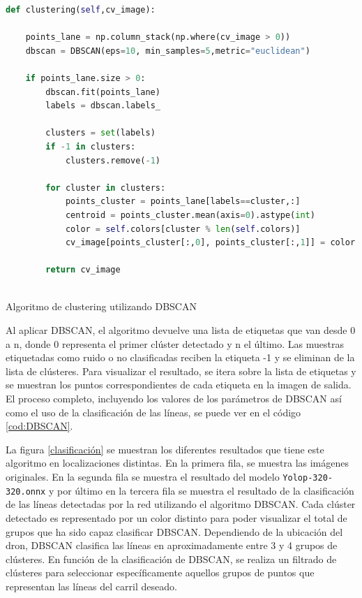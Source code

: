 \begin{code}[h]
  \begin{footnotesize}
  \begin{lstlisting}[language=Python]
    def clustering(self,cv_image):
    
    points_lane = np.column_stack(np.where(cv_image > 0))
    dbscan = DBSCAN(eps=10, min_samples=5,metric="euclidean")

    if points_lane.size > 0:
        dbscan.fit(points_lane)
        labels = dbscan.labels_

        clusters = set(labels)
        if -1 in clusters:
            clusters.remove(-1)
    
        for cluster in clusters:
            points_cluster = points_lane[labels==cluster,:]
            centroid = points_cluster.mean(axis=0).astype(int)
            color = self.colors[cluster % len(self.colors)]
            cv_image[points_cluster[:,0], points_cluster[:,1]] = color

        return cv_image
  
  \end{lstlisting}
  \caption[Algoritmo de clustering utilizando DBSCAN]{Algoritmo de clustering utilizando DBSCAN}
  \label{cod:DBSCAN}
  \end{footnotesize}
  \end{code}  


Al aplicar DBSCAN, el algoritmo devuelve una lista de etiquetas que van desde 0 a n, 
donde 0 representa el primer clúster detectado y n el último. Las muestras etiquetadas como ruido o no clasificadas reciben la etiqueta -1 y se eliminan de la lista de clústeres. Para visualizar 
el resultado, se itera sobre la lista de etiquetas y se muestran los puntos correspondientes de cada etiqueta en la imagen de salida. El proceso completo, incluyendo los valores 
de los parámetros de DBSCAN así como el uso de la clasificación de las líneas, se puede ver en el código \ref{cod:DBSCAN}.

La figura \ref{clasificación} se muestran los diferentes resultados que tiene este algoritmo en localizaciones distintas. En la primera fila, se muestra las imágenes originales. En la segunda 
fila se muestra el resultado del modelo \texttt{Yolop-320-320.onnx} y por último en la tercera fila se muestra el resultado de la clasificación de las líneas detectadas por la red 
utilizando el algoritmo DBSCAN. Cada clúster detectado es representado por un color distinto para poder visualizar el total de grupos que ha sido capaz clasificar DBSCAN.
Dependiendo de la ubicación del dron, DBSCAN clasifica las líneas en aproximadamente entre 3 y 4 grupos de clústeres. En función de la clasificación de DBSCAN, se realiza 
un filtrado de clústeres para seleccionar específicamente aquellos grupos de puntos que representan las líneas del carril deseado.

